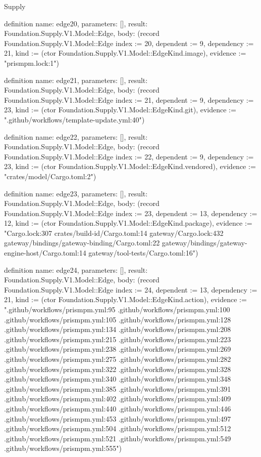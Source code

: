\begin{lexlean}{Supply}
\begin{semanticmodule}
definition{
  name: edge20,
  parameters: [],
  result: Foundation.Supply.V1.Model::Edge,
  body: (record Foundation.Supply.V1.Model::Edge {index := 20, dependent := 9, dependency := 21, kind := (ctor Foundation.Supply.V1.Model::EdgeKind.image), evidence := "prismpm.lock:1"})
}

definition{
  name: edge21,
  parameters: [],
  result: Foundation.Supply.V1.Model::Edge,
  body: (record Foundation.Supply.V1.Model::Edge {index := 21, dependent := 9, dependency := 23, kind := (ctor Foundation.Supply.V1.Model::EdgeKind.git), evidence := ".github/workflows/template-update.yml:40"})
}

definition{
  name: edge22,
  parameters: [],
  result: Foundation.Supply.V1.Model::Edge,
  body: (record Foundation.Supply.V1.Model::Edge {index := 22, dependent := 9, dependency := 23, kind := (ctor Foundation.Supply.V1.Model::EdgeKind.vendored), evidence := "crates/model/Cargo.toml:2"})
}

definition{
  name: edge23,
  parameters: [],
  result: Foundation.Supply.V1.Model::Edge,
  body: (record Foundation.Supply.V1.Model::Edge {index := 23, dependent := 13, dependency := 12, kind := (ctor Foundation.Supply.V1.Model::EdgeKind.package), evidence := "Cargo.lock:307 crates/build-id/Cargo.toml:14 gateway/Cargo.lock:432 gateway/bindings/gateway-binding/Cargo.toml:22 gateway/bindings/gateway-engine-host/Cargo.toml:14 gateway/tool-tests/Cargo.toml:16"})
}

definition{
  name: edge24,
  parameters: [],
  result: Foundation.Supply.V1.Model::Edge,
  body: (record Foundation.Supply.V1.Model::Edge {index := 24, dependent := 13, dependency := 21, kind := (ctor Foundation.Supply.V1.Model::EdgeKind.action), evidence := ".github/workflows/prismpm.yml:95 .github/workflows/prismpm.yml:100 .github/workflows/prismpm.yml:105 .github/workflows/prismpm.yml:128 .github/workflows/prismpm.yml:134 .github/workflows/prismpm.yml:208 .github/workflows/prismpm.yml:215 .github/workflows/prismpm.yml:223 .github/workflows/prismpm.yml:238 .github/workflows/prismpm.yml:269 .github/workflows/prismpm.yml:275 .github/workflows/prismpm.yml:282 .github/workflows/prismpm.yml:322 .github/workflows/prismpm.yml:328 .github/workflows/prismpm.yml:340 .github/workflows/prismpm.yml:348 .github/workflows/prismpm.yml:385 .github/workflows/prismpm.yml:391 .github/workflows/prismpm.yml:402 .github/workflows/prismpm.yml:409 .github/workflows/prismpm.yml:440 .github/workflows/prismpm.yml:446 .github/workflows/prismpm.yml:453 .github/workflows/prismpm.yml:497 .github/workflows/prismpm.yml:504 .github/workflows/prismpm.yml:512 .github/workflows/prismpm.yml:521 .github/workflows/prismpm.yml:549 .github/workflows/prismpm.yml:555"})
}


\end{semanticmodule}
\end{lexlean}
